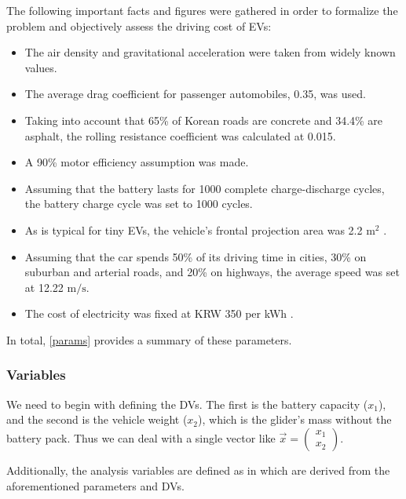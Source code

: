 \documentclass[11pt,twocolumn]{article}
\begin{document}
                The following important facts and figures were gathered in order to formalize the problem and objectively assess the driving cost of EVs:
                \begin{itemize}
                    \item The air density and gravitational acceleration were taken from widely known values.
                    \item The average drag coefficient for passenger automobiles, 0.35, was used\cite{35coefficient}.
                    \item Taking into account that 65\% of Korean roads are concrete and 34.4\% are asphalt, the rolling resistance coefficient was calculated at 0.015.\cite{65perconcreteand344percentasphalt}
                    \item A 90\% motor efficiency assumption was made\cite{90percentefficiency}.
                    \item Assuming that the battery lasts for 1000 complete charge-discharge cycles, the battery charge cycle was set to 1000 cycles\cite{lifecycle1000}.
                    \item As is typical for tiny EVs, the vehicle's frontal projection area  was 2.2 $\mathrm{m^2}$ \cite{Frontalarea22}.
                    \item Assuming that the car spends 50\% of its driving time in cities, 30\% on suburban and arterial roads, and 20\% on highways, the average speed was set at 12.22 $\mathrm{m/s}$.
                    \item The cost of electricity was fixed at KRW 350 per kWh \cite{350won}.
                \end{itemize}
                In total, \cref{params} provides a summary of these parameters.

            \subsubsection{Variables}
                We need to begin with defining the DVs.
                The first is the battery capacity ($x_1$), and the second is the vehicle weight ($x_2$), which is the glider's mass without the battery pack.
                Thus we can deal with a single vector like $\vec{x}=\left(\begin{smallmatrix}x_1\\x_2\end{smallmatrix}\right)$.
                \par
                Additionally, the analysis variables are defined as in  which are derived from the aforementioned parameters and DVs.
\end{document}
